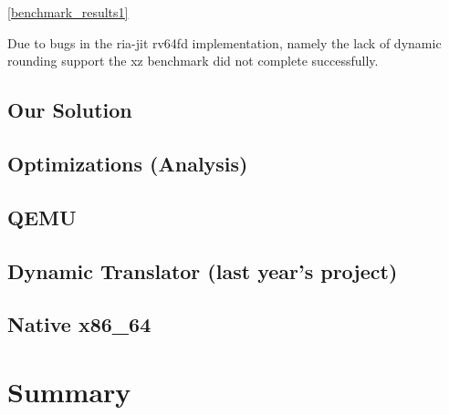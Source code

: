 \documentclass[course=eragp]{aspdoc}
\begin{document}
\ref{benchmark_results1}

Due to bugs in the ria-jit rv64fd implementation, namely the lack of dynamic rounding support %
the xz benchmark did not complete successfully.

\subsection{Our Solution}
\subsection{Optimizations (Analysis)}
\subsection{QEMU}
\subsection{Dynamic Translator (last year's project)}
\subsection{Native x86\_64}

\section{Summary}

\clearpage


{}
\end{document}
